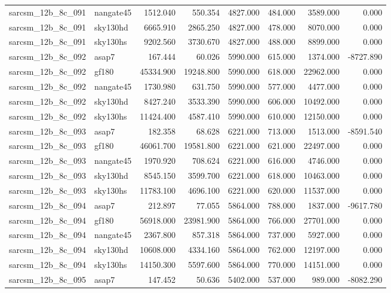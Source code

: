 \begin{tabular}{llrrrrrr}
sarcsm\_12b\_8c\_091 & nangate45 & 1512.040 & 550.354 & 4827.000 & 484.000 & 3589.000 & 0.000 \\
sarcsm\_12b\_8c\_091 & sky130hd & 6665.910 & 2865.250 & 4827.000 & 478.000 & 8070.000 & 0.000 \\
sarcsm\_12b\_8c\_091 & sky130hs & 9202.560 & 3730.670 & 4827.000 & 488.000 & 8899.000 & 0.000 \\
sarcsm\_12b\_8c\_092 & asap7 & 167.444 & 60.026 & 5990.000 & 615.000 & 1374.000 & -8727.890 \\
sarcsm\_12b\_8c\_092 & gf180 & 45334.900 & 19248.800 & 5990.000 & 618.000 & 22962.000 & 0.000 \\
sarcsm\_12b\_8c\_092 & nangate45 & 1730.980 & 631.750 & 5990.000 & 577.000 & 4477.000 & 0.000 \\
sarcsm\_12b\_8c\_092 & sky130hd & 8427.240 & 3533.390 & 5990.000 & 606.000 & 10492.000 & 0.000 \\
sarcsm\_12b\_8c\_092 & sky130hs & 11424.400 & 4587.410 & 5990.000 & 610.000 & 12150.000 & 0.000 \\
sarcsm\_12b\_8c\_093 & asap7 & 182.358 & 68.628 & 6221.000 & 713.000 & 1513.000 & -8591.540 \\
sarcsm\_12b\_8c\_093 & gf180 & 46061.700 & 19581.800 & 6221.000 & 621.000 & 22497.000 & 0.000 \\
sarcsm\_12b\_8c\_093 & nangate45 & 1970.920 & 708.624 & 6221.000 & 616.000 & 4746.000 & 0.000 \\
sarcsm\_12b\_8c\_093 & sky130hd & 8545.150 & 3599.700 & 6221.000 & 618.000 & 10463.000 & 0.000 \\
sarcsm\_12b\_8c\_093 & sky130hs & 11783.100 & 4696.100 & 6221.000 & 620.000 & 11537.000 & 0.000 \\
sarcsm\_12b\_8c\_094 & asap7 & 212.897 & 77.055 & 5864.000 & 788.000 & 1837.000 & -9617.780 \\
sarcsm\_12b\_8c\_094 & gf180 & 56918.000 & 23981.900 & 5864.000 & 766.000 & 27701.000 & 0.000 \\
sarcsm\_12b\_8c\_094 & nangate45 & 2367.800 & 857.318 & 5864.000 & 737.000 & 5927.000 & 0.000 \\
sarcsm\_12b\_8c\_094 & sky130hd & 10608.000 & 4334.160 & 5864.000 & 762.000 & 12197.000 & 0.000 \\
sarcsm\_12b\_8c\_094 & sky130hs & 14150.300 & 5597.600 & 5864.000 & 770.000 & 14151.000 & 0.000 \\
sarcsm\_12b\_8c\_095 & asap7 & 147.452 & 50.636 & 5402.000 & 537.000 & 989.000 & -8082.290 \\

\end{tabular}
